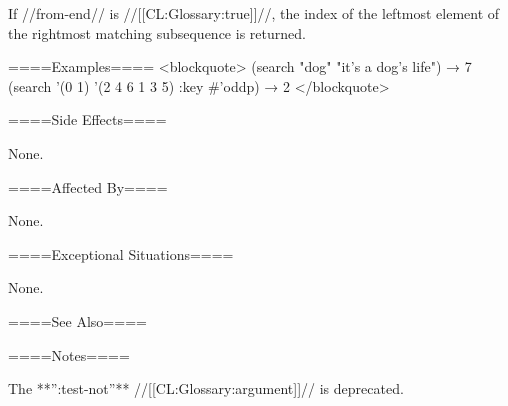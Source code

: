 If //from-end// is //[[CL:Glossary:true]]//, the index of the leftmost element of the rightmost matching subsequence is returned.

====Examples==== <blockquote> (search "dog" "it's a dog's life") → 7 (search '(0 1) '(2 4 6 1 3 5) :key #'oddp) → 2 </blockquote>

====Side Effects====

None.

====Affected By====

None.

====Exceptional Situations====

None.

====See Also====

{\secref\TraversalRules}

====Notes====

The **'':test-not''** //[[CL:Glossary:argument]]// is deprecated.



   
